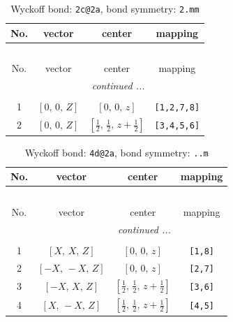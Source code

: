 \documentclass[fleqn,8pt]{jsarticle}
\begin{document}
\renewcommand{\arraystretch}{1.2}
\begin{longtable}{cccc}
\caption{Wyckoff bond: {\tt 2c@2a}, bond symmetry: {\tt 2.mm}}
 \\
 \hline \hline
No. & vector & center & mapping \\ \hline \endfirsthead

\multicolumn{3}{l}{\tablename\ \thetable{}} \\
 \hline \hline
No. & vector & center & mapping \\ \hline \endhead

 \hline \hline
\multicolumn{3}{r}{\footnotesize\it continued ...} \\ \endfoot

 \hline \hline
\multicolumn{3}{r}{} \\ \endlastfoot

1 & $\left[ 0,\, 0,\, Z \right]$ & $\left[ 0,\, 0,\, z \right]$ & {\tt [1,2,7,8]} \\ \hline
2 & $\left[ 0,\, 0,\, Z \right]$ & $\left[ \frac{1}{2},\, \frac{1}{2},\, z + \frac{1}{2} \right]$ & {\tt [3,4,5,6]} \\
\end{longtable}
\renewcommand{\arraystretch}{1.2}
\begin{longtable}{cccc}
\caption{Wyckoff bond: {\tt 4d@2a}, bond symmetry: {\tt ..m}}
 \\
 \hline \hline
No. & vector & center & mapping \\ \hline \endfirsthead

\multicolumn{3}{l}{\tablename\ \thetable{}} \\
 \hline \hline
No. & vector & center & mapping \\ \hline \endhead

 \hline \hline
\multicolumn{3}{r}{\footnotesize\it continued ...} \\ \endfoot

 \hline \hline
\multicolumn{3}{r}{} \\ \endlastfoot

1 & $\left[ X,\, X,\, Z \right]$ & $\left[ 0,\, 0,\, z \right]$ & {\tt [1,8]} \\ \hline
2 & $\left[ - X,\, - X,\, Z \right]$ & $\left[ 0,\, 0,\, z \right]$ & {\tt [2,7]} \\ \hline
3 & $\left[ - X,\, X,\, Z \right]$ & $\left[ \frac{1}{2},\, \frac{1}{2},\, z + \frac{1}{2} \right]$ & {\tt [3,6]} \\ \hline
4 & $\left[ X,\, - X,\, Z \right]$ & $\left[ \frac{1}{2},\, \frac{1}{2},\, z + \frac{1}{2} \right]$ & {\tt [4,5]} \\
\end{longtable}
\end{document}
